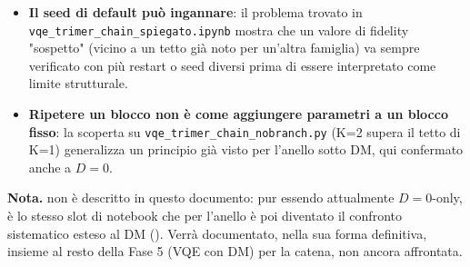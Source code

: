\documentclass[11pt,a4paper]{article}
\begin{document}
\begin{itemize}
\item \textbf{Il seed di default può ingannare}: il problema trovato in
\texttt{vqe\_trimer\_chain\_spiegato.ipynb} mostra che un valore di fidelity
"sospetto" (vicino a un tetto già noto per un'altra famiglia) va sempre verificato con
più restart o seed diversi prima di essere interpretato come limite strutturale.
\item \textbf{Ripetere un blocco non è come aggiungere parametri a un blocco fisso}:
la scoperta su \texttt{vqe\_trimer\_chain\_nobranch.py} (K=2 supera il tetto di K=1)
generalizza un principio già visto per l'anello sotto DM, qui confermato anche a
$D=0$.
\end{itemize}

\textbf{Nota.} \texttt{} non è
descritto in questo documento: pur essendo attualmente $D=0$-only, è lo stesso slot
di notebook che per l'anello è poi diventato il confronto sistematico esteso al DM
(\texttt{}). Verrà documentato,
nella sua forma definitiva, insieme al resto della Fase 5 (VQE con DM) per la catena,
non ancora affrontata.
\end{document}
